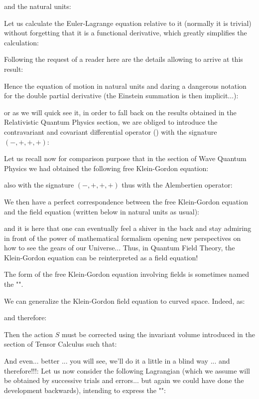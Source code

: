 	and the natural units:
	
	Let us calculate the Euler-Lagrange equation relative to it (normally it is trivial) without forgetting that it is a functional derivative, which greatly simplifies the calculation:
	
	Following the request of a reader here are the details allowing to arrive at this result:
	
	Hence the equation of motion in natural units and daring a dangerous notation for the double partial derivative (the Einstein summation is then implicit...):
	
	or as we will quick see it, in order to fall back on the results obtained in the Relativistic Quantum Physics section, we are obliged to introduce the contravariant and covariant differential operator () with the signature $(-, + , +, +)$:
	
	Let us recall now for comparison purpose that in the section of Wave Quantum Physics we had obtained the following free Klein-Gordon equation:
	
	also with the signature $(-, +, +, +)$ thus with the Alembertien operator:
	
	We then have a perfect correspondence between the free Klein-Gordon equation and the field equation (written below in natural units as usual):
	
	and it is here that one can eventually feel a shiver in the back and stay admiring in front of the power of mathematical formalism opening new perspectives on how to see the gears of our Universe... Thus, in Quantum Field Theory, the Klein-Gordon equation can be reinterpreted as a field equation! 

	The form of the free Klein-Gordon equation involving fields is sometimes named the "".
	\begin{tcolorbox}[title=Remark,colframe=black,arc=10pt]
	We can generalize the Klein-Gordon field equation to curved space. Indeed, as:
	
	and therefore:
	
	Then the action $S$ must be corrected using the invariant volume introduced in the section of Tensor Calculus such that:
	
	\end{tcolorbox}
	And even... better ... you will see, we'll do it a little in a blind way ... and therefore!!!: Let us now consider the following Lagrangian (which we assume will be obtained by successive trials and errors... but again we could have done the development backwards), intending to express the "":
	
